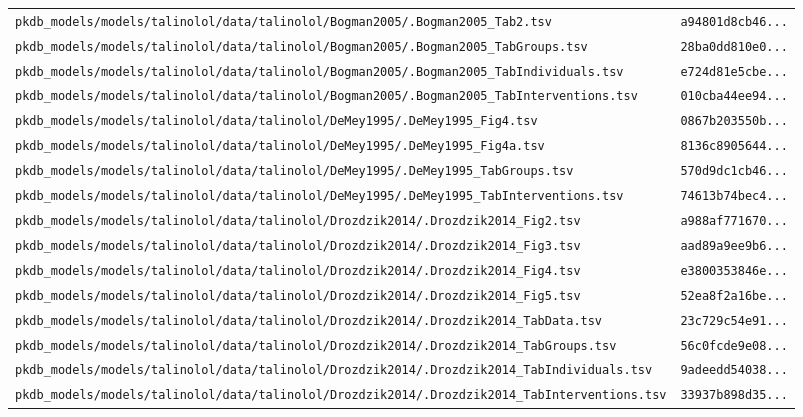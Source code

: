 \documentclass{article}
\begin{document}
\begin{longtable}{ll}
\texttt{pkdb\_models/models/talinolol/data/talinolol/Bogman2005/.Bogman2005\_Tab2.tsv} & \texttt{a94801d8cb46...} \\
\texttt{pkdb\_models/models/talinolol/data/talinolol/Bogman2005/.Bogman2005\_TabGroups.tsv} & \texttt{28ba0dd810e0...} \\
\texttt{pkdb\_models/models/talinolol/data/talinolol/Bogman2005/.Bogman2005\_TabIndividuals.tsv} & \texttt{e724d81e5cbe...} \\
\texttt{pkdb\_models/models/talinolol/data/talinolol/Bogman2005/.Bogman2005\_TabInterventions.tsv} & \texttt{010cba44ee94...} \\
\texttt{pkdb\_models/models/talinolol/data/talinolol/DeMey1995/.DeMey1995\_Fig4.tsv} & \texttt{0867b203550b...} \\
\texttt{pkdb\_models/models/talinolol/data/talinolol/DeMey1995/.DeMey1995\_Fig4a.tsv} & \texttt{8136c8905644...} \\
\texttt{pkdb\_models/models/talinolol/data/talinolol/DeMey1995/.DeMey1995\_TabGroups.tsv} & \texttt{570d9dc1cb46...} \\
\texttt{pkdb\_models/models/talinolol/data/talinolol/DeMey1995/.DeMey1995\_TabInterventions.tsv} & \texttt{74613b74bec4...} \\
\texttt{pkdb\_models/models/talinolol/data/talinolol/Drozdzik2014/.Drozdzik2014\_Fig2.tsv} & \texttt{a988af771670...} \\
\texttt{pkdb\_models/models/talinolol/data/talinolol/Drozdzik2014/.Drozdzik2014\_Fig3.tsv} & \texttt{aad89a9ee9b6...} \\
\texttt{pkdb\_models/models/talinolol/data/talinolol/Drozdzik2014/.Drozdzik2014\_Fig4.tsv} & \texttt{e3800353846e...} \\
\texttt{pkdb\_models/models/talinolol/data/talinolol/Drozdzik2014/.Drozdzik2014\_Fig5.tsv} & \texttt{52ea8f2a16be...} \\
\texttt{pkdb\_models/models/talinolol/data/talinolol/Drozdzik2014/.Drozdzik2014\_TabData.tsv} & \texttt{23c729c54e91...} \\
\texttt{pkdb\_models/models/talinolol/data/talinolol/Drozdzik2014/.Drozdzik2014\_TabGroups.tsv} & \texttt{56c0fcde9e08...} \\
\texttt{pkdb\_models/models/talinolol/data/talinolol/Drozdzik2014/.Drozdzik2014\_TabIndividuals.tsv} & \texttt{9adeedd54038...} \\
\texttt{pkdb\_models/models/talinolol/data/talinolol/Drozdzik2014/.Drozdzik2014\_TabInterventions.tsv} & \texttt{33937b898d35...} \\

\end{longtable}
\end{document}
